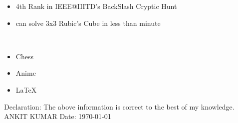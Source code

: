 \documentclass[10pt]{extarticle}
\newcommand{\yourname}{ANKIT KUMAR}%
\begin{document}
\begin{contained}
\vspace{0pt}
\begin{itemize}
    \setlength\itemsep{0.5pt}
    \item 4th Rank in IEEE@IIITD's BackSlash Cryptic Hunt
    \item can solve 3x3 Rubic's Cube in less than minute

\end{itemize}
\vspace{0pt}
\end{contained}
\begin{contained}\\
\begin{itemize}
    \setlength\itemsep{0.5pt}
    \item Chess
    \item Anime
    \item \LaTeX
\end{itemize}
\end{contained}
Declaration: The above information is correct to the best of my knowledge.\newline
\yourname\newline
Date: \today
\end{document}
